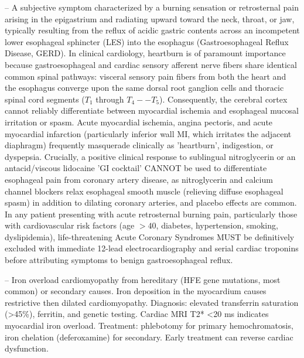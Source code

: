 -- A subjective symptom characterized by a burning sensation or retrosternal pain arising in the epigastrium and radiating upward toward the neck, throat, or jaw, typically resulting from the reflux of acidic gastric contents across an incompetent lower esophageal sphincter (LES) into the esophagus (Gastroesophageal Reflux Disease, GERD). In clinical cardiology, heartburn is of paramount importance because gastroesophageal and cardiac sensory afferent nerve fibers share identical common spinal pathways: visceral sensory pain fibers from both the heart and the esophagus converge upon the same dorsal root ganglion cells and thoracic spinal cord segments ($T_1$ through $T_4--T_5$). Consequently, the cerebral cortex cannot reliably differentiate between myocardial ischemia and esophageal mucosal irritation or spasm. Acute myocardial ischemia, angina pectoris, and acute myocardial infarction (particularly inferior wall MI, which irritates the adjacent diaphragm) frequently masquerade clinically as 'heartburn', indigestion, or dyspepsia. Crucially, a positive clinical response to sublingual nitroglycerin or an antacid/viscous lidocaine 'GI cocktail' CANNOT be used to differentiate esophageal pain from coronary artery disease, as nitroglycerin and calcium channel blockers relax esophageal smooth muscle (relieving diffuse esophageal spasm) in addition to dilating coronary arteries, and placebo effects are common. In any patient presenting with acute retrosternal burning pain, particularly those with cardiovascular risk factors (age $>40$, diabetes, hypertension, smoking, dyslipidemia), life-threatening Acute Coronary Syndromes MUST be definitively excluded with immediate 12-lead electrocardiography and serial cardiac troponins before attributing symptoms to benign gastroesophageal reflux.

-- Iron overload cardiomyopathy from hereditary (HFE gene mutations, most common) or secondary causes. Iron deposition in the myocardium causes restrictive then dilated cardiomyopathy. Diagnosis: elevated transferrin saturation (>45\%), ferritin, and genetic testing. Cardiac MRI T2* <20 ms indicates myocardial iron overload. Treatment: phlebotomy for primary hemochromatosis, iron chelation (deferoxamine) for secondary. Early treatment can reverse cardiac dysfunction.

